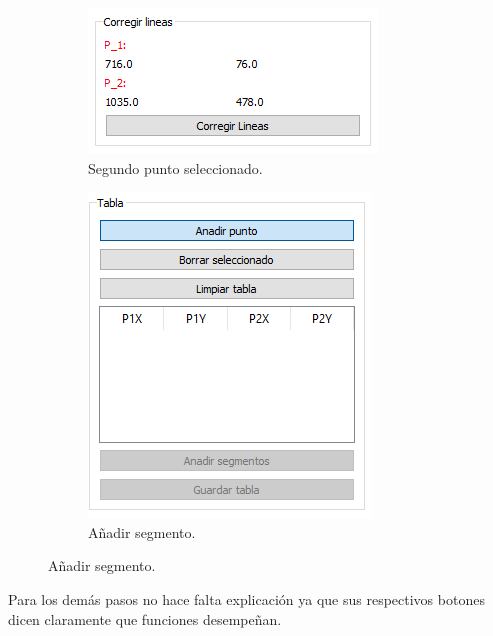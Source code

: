 \documentclass[13pt]{book}              %
\begin{document}
{\begin{figure}
	\begin{subfigure}[c]{.5\linewidth}
	\centering\large \includegraphics[width=.9\textwidth]{punto2}
	\caption{Segundo punto seleccionado.}\label{fig:punto2}
	\end{subfigure}%
	\begin{subfigure}[c]{.5\linewidth}
	\centering\large \includegraphics[width=.9\textwidth]{anadirsegment}
	\caption{Añadir segmento.}\label{fig:anadirsegment}
	\end{subfigure}%
\end{figure}

	
Para los demás pasos no hace falta explicación ya que sus respectivos botones dicen claramente que funciones desempeñan.	
	
}
\end{document}
